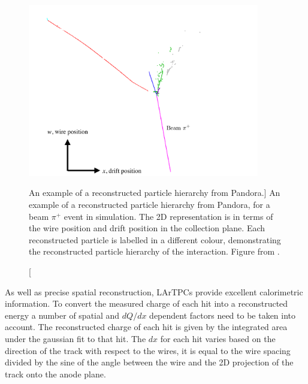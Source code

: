 \begin{figure}

	\centering

	\includegraphics[width=0.9\textwidth]{figures/pandoraEvent.pdf}

	\caption
	[An example of a reconstructed particle hierarchy from Pandora.]
	{An example of a reconstructed particle hierarchy from Pandora, for a beam
	$\pi^+$ event in \protodune{} simulation. The 2D representation is in terms 
	of the wire position and drift position in the collection plane. Each 
	reconstructed particle is labelled in a different colour, demonstrating the 
	reconstructed particle hierarchy of the interaction. Figure from 
	\cite{protoduneperf}.}

	\label{fig:pandora_pfp}

\end{figure}

As well as precise spatial reconstruction, LArTPCs provide excellent
calorimetric information. To convert the measured charge of each hit into a
reconstructed energy a number of spatial and $dQ/dx$ dependent factors need to
be taken into account. The reconstructed charge of each hit is given by the
integrated area under the gaussian fit to that hit. The $dx$ for each hit varies
based on the direction of the track with respect to the wires, it is equal to
the wire spacing divided by the sine of the angle between the wire and the 2D
projection of the track onto the anode plane.


